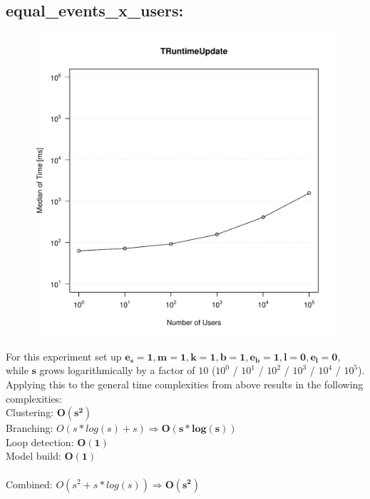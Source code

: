 \documentclass[10pt,a4paper]{article}
\begin{document}
	\subsection{equal\_events\_x\_users:}
	\begin{figure}[H]
		\centering
		\includegraphics[scale=0.7]{graphics/TRuntimeUpdate_median_equal_events.pdf}
	\end{figure}
	For this experiment set up $\mathbf{e_s = 1, m = 1, k = 1, b = 1, e_b = 1, l = 0, e_l = 0}$, while $\mathbf{s}$ grows logarithmically by a factor of $10$ ($10^0$ / $10^1$ / $10^2$ / $10^3$ / $10^4$ / $10^5$). Applying this to the general time complexities from above results in the following complexities:\\
	Clustering: $\mathbf{O(s^2)}$\\
	Branching: $O(s * log(s) + s) \Rightarrow \mathbf{O(s * log(s))}$\\
	Loop detection: $\mathbf{O(1)}$\\
	Model build: $\mathbf{O(1)}$\\
	\\
	Combined: $O(s^2 + s * log(s)) \Rightarrow \mathbf{O(s^2)}$\\
	
\end{document}

